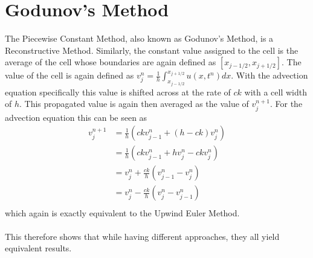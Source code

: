 \section{Godunov's Method}
The Piecewise Constant Method, also known as Godunov's Method, is a Reconstructive Method. Similarly, the constant value assigned to the cell is the average of the cell whose boundaries are again defined as $[x_{j-1/2},x_{j+1/2}]$. The value of the cell is again defined as $v^n_j=\frac{1}{h}\int_{x_{j-1/2}}^{x_{j+1/2}}u(x,t^n)dx$. With the advection equation specifically this value is shifted across at the rate of $ck$ with a cell width of $h$. This propagated value is again then averaged as the value of $v^{n+1}_j$. For the advection equation this can be seen as
\begin{align*}
  v^{n+1}_j &= \frac{1}{h}(ckv^n_{j-1} + (h-ck)v^n_j) \\
            &= \frac{1}{h}(ckv^n_{j-1} + hv^n_j - ckv^n_j) \\
            &= v^n_j + \frac{ck}{h}(v^n_{j-1} - v^n_j) \\
            &= v^n_j - \frac{ck}{h}(v^n_j - v^n_{j-1}) \\
\end{align*} 
which again is exactly equivalent to the Upwind Euler Method.
\\
\\
This therefore shows that while having different approaches, they all yield equivalent results.